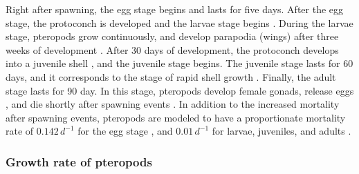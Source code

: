 Right after spawning, the egg stage begins and lasts for five days. After the egg stage, the protoconch is developed and the larvae stage begins \citep{Thabet2015Lifestages}. During the larvae stage, pteropods grow continuously, and develop parapodia (wings) after three weeks of development \citep{Thabet2015Lifestages}. After 30 days of development, the protoconch develops into a juvenile shell \citep{Thabet2015Lifestages}, and the juvenile stage begins. The juvenile stage lasts for 60 days, and it corresponds to the stage of rapid shell growth \citep{Thabet2015Lifestages}. Finally, the adult stage lasts for 90 day. In this stage, pteropods develop female gonads, release eggs \citep{lalli1989pelagic,Thabet2015Lifestages,Bednarsek2016CumulativeEffects}, and die shortly after spawning events \citep{Dadon1992Reproduction,Gannefors2005Overwintering,Hunt2008TopPredators,Howes2014Lab}. In addition to the increased mortality after spawning events, pteropods are modeled to have a proportionate mortality rate of $0.142 \, d^{-1}$ for the egg stage \citep{Bednarsek2016CumulativeEffects}, and $0.01\, d^{-1}$ for larvae, juveniles, and adults \citep{Bednarsek2012DryWeight,Bednarsek2016CumulativeEffects}.


\subsubsection{Growth rate of pteropods}\label{sec:growthRates}

